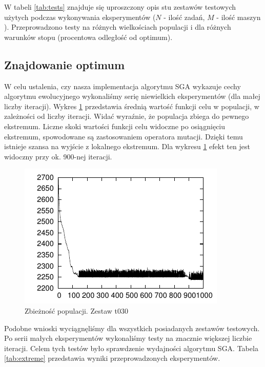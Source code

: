 \documentclass[12pt]{article}
\begin{document}
W tabeli \ref{tab:tests} znajduje się uproszczony opis stu zestawów testowych użytych
podczas wykonywania eksperymentów ($N$ - ilość zadań, $M$ - ilość maszyn ). Przeprowadzono testy na różnych wielkościach populacji i dla różnych warunków stopu
(procentowa odległość od optimum).

\subsection{Znajdowanie optimum}

W celu ustalenia, czy nasza implementacja algorytmu SGA wykazuje cechy algorytmu ewolucyjnego wykonaliśmy serię niewielkich eksperymentów (dla małej liczby iteracji).
Wykres \ref{pic:plot1} przedstawia średnią wartość funkcji celu w populacji, w zależności od liczby iteracji. Widać wyraźnie, że populacja zbiega do pewnego ekstremum.
Liczne skoki wartości funkcji celu widoczne po osiągnięciu ekstremum, spowodowane są zastosowaniem operatora mutacji. Dzięki temu istnieje szansa na wyjście z lokalnego ekstremum.
Dla wykresu \ref{pic:plot1} efekt ten jest widoczny przy ok. 900-nej iteracji. 

\begin{figure}
  \centering
  \includegraphics[scale=1.5]{plots/plot1.pdf}
  \caption{Zbieżność populacji. Zestaw t030}
  \label{pic:plot1}
\end{figure}

Podobne wnioski wyciągnęliśmy dla wszystkich posiadanych zestawów testowych. Po serii małych eksperymentów wykonaliśmy testy na znacznie większej liczbie iteracji.
Celem tych testów było sprawdzenie wydajności algorytmu SGA. Tabela \ref{tab:extreme} przedstawia wyniki przeprowadzonych eksperymentów.
\end{document}
